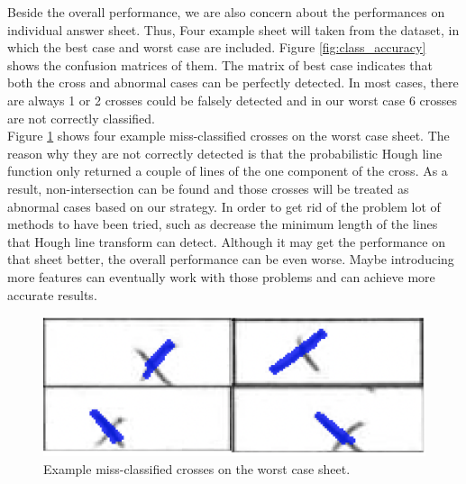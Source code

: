 \documentclass[a4paper,twoside]{article}
\begin{document}
Beside the overall performance, we are also concern about the performances on individual answer sheet. Thus, Four example sheet will taken from the dataset, in which the best case and worst case are included. Figure \ref{fig:class_accuracy} shows the confusion matrices of them. The matrix of best case indicates that both the cross and abnormal cases can be perfectly detected. In most cases, there are always 1 or 2 crosses could be falsely detected and in our worst case 6 crosses are not correctly classified.\\
Figure \ref{fig:worst case} shows four example miss-classified crosses on the worst case sheet. The reason why they are not correctly detected is that the probabilistic Hough line function only returned a couple of lines of the one component of the cross. As a result, non-intersection can be found and those crosses will be treated as abnormal cases based on our strategy. In order to  get rid of the problem lot of methods to have been tried, such as decrease the minimum length of the lines that Hough line transform can detect. Although it may get the performance on that sheet better, the overall performance can be even worse. Maybe introducing more features can eventually work with those problems and can achieve more accurate results.\\
 \begin{figure}[!h]
  \centering
  \includegraphics[width=\columnwidth]{Latex/imgs/notdetected.png}
  \caption{Example miss-classified crosses on the worst case sheet.}
  \label{fig:worst case}
 \end{figure}



 
\end{document}
